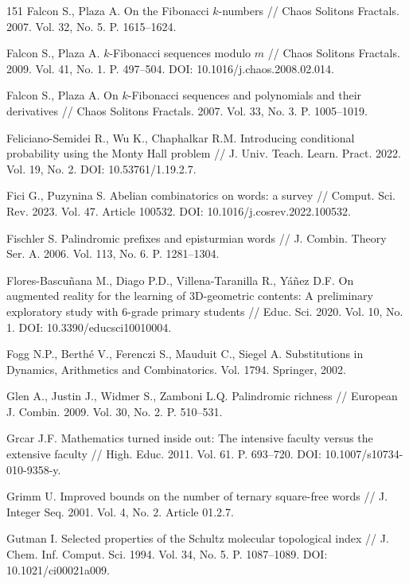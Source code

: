 \documentclass[a4paper,14pt]{extreport}
\theoremstyle{plain}
\theoremstyle{definition}
\theoremstyle{remark}
\begin{document}
\begin{thebibliography}{151}
		Falcon S., Plaza A. On the Fibonacci $k$-numbers // Chaos Solitons Fractals. 2007. Vol. 32, No. 5. P. 1615--1624.
		
		Falcon S., Plaza A. $k$-Fibonacci sequences modulo $m$ // Chaos Solitons Fractals. 2009. Vol. 41, No. 1. P. 497--504. DOI: 10.1016/j.chaos.2008.02.014.
		
		Falcon S., Plaza A. On $k$-Fibonacci sequences and polynomials and their derivatives // Chaos Solitons Fractals. 2007. Vol. 33, No. 3. P. 1005--1019.
		
		Feliciano-Semidei R., Wu K., Chaphalkar R.M. Introducing conditional probability using the Monty Hall problem // J. Univ. Teach. Learn. Pract. 2022. Vol. 19, No. 2. DOI: 10.53761/1.19.2.7.
		
		Fici G., Puzynina S. Abelian combinatorics on words: a survey // Comput. Sci. Rev. 2023. Vol. 47. Article 100532. DOI: 10.1016/j.cosrev.2022.100532.
		
		Fischler S. Palindromic prefixes and episturmian words // J. Combin. Theory Ser. A. 2006. Vol. 113, No. 6. P. 1281--1304.
		
		Flores-Bascuñana M., Diago P.D., Villena-Taranilla R., Yáñez D.F. On augmented reality for the learning of 3D-geometric contents: A preliminary exploratory study with 6-grade primary students // Educ. Sci. 2020. Vol. 10, No. 1. DOI: 10.3390/educsci10010004.
		
		Fogg N.P., Berthé V., Ferenczi S., Mauduit C., Siegel A. Substitutions in Dynamics, Arithmetics and Combinatorics. Vol. 1794. Springer, 2002.
		
		Glen A., Justin J., Widmer S., Zamboni L.Q. Palindromic richness // European J. Combin. 2009. Vol. 30, No. 2. P. 510--531.
		
		Grcar J.F. Mathematics turned inside out: The intensive faculty versus the extensive faculty // High. Educ. 2011. Vol. 61. P. 693--720. DOI: 10.1007/s10734-010-9358-y.
		
		Grimm U. Improved bounds on the number of ternary square-free words // J. Integer Seq. 2001. Vol. 4, No. 2. Article 01.2.7.
		
		Gutman I. Selected properties of the Schultz molecular topological index // J. Chem. Inf. Comput. Sci. 1994. Vol. 34, No. 5. P. 1087--1089. DOI: 10.1021/ci00021a009.
		

\end{thebibliography}
\end{document}
